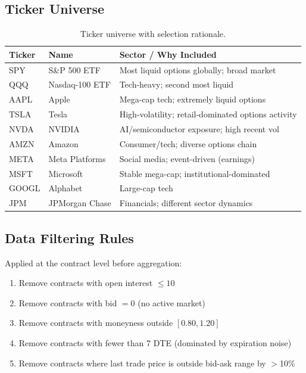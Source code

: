 \documentclass[11pt,a4paper]{article}
\begin{document}
\subsection{Ticker Universe}

\begin{table}[H]
\centering
\begin{tabular}{@{}lll@{}}
\toprule
\textbf{Ticker} & \textbf{Name} & \textbf{Sector / Why Included} \\
\midrule
SPY & S\&P 500 ETF & Most liquid options globally; broad market \\
QQQ & Nasdaq-100 ETF & Tech-heavy; second most liquid \\
AAPL & Apple & Mega-cap tech; extremely liquid options \\
TSLA & Tesla & High-volatility; retail-dominated options activity \\
NVDA & NVIDIA & AI/semiconductor exposure; high recent vol \\
AMZN & Amazon & Consumer/tech; diverse options chain \\
META & Meta Platforms & Social media; event-driven (earnings) \\
MSFT & Microsoft & Stable mega-cap; institutional-dominated \\
GOOGL & Alphabet & Large-cap tech \\
JPM & JPMorgan Chase & Financials; different sector dynamics \\
\bottomrule
\end{tabular}
\caption{Ticker universe with selection rationale.}
\end{table}

\subsection{Data Filtering Rules}

Applied at the contract level before aggregation:
\begin{enumerate}[nosep]
    \item Remove contracts with open interest $\leq 10$
    \item Remove contracts with bid $= 0$ (no active market)
    \item Remove contracts with moneyness outside $[0.80, 1.20]$
    \item Remove contracts with fewer than 7 DTE (dominated by expiration noise)
    \item Remove contracts where last trade price is outside bid-ask range by $>$10\%
\end{enumerate}
\end{document}
